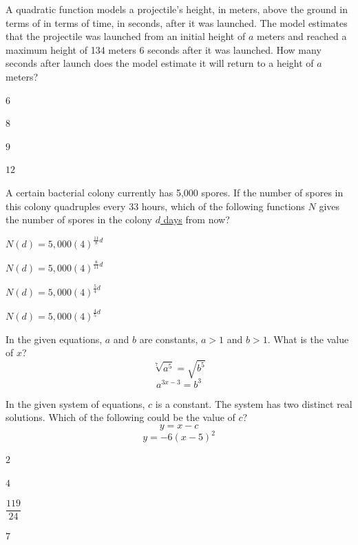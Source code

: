 \vfill
\noindent\begin{minipage}{\linewidth}
\par\smallskip
A quadratic function models a projectile's height, in meters, above the ground in terms of in terms of time, in seconds, after it was launched. The model estimates that the projectile was launched from an initial height of $a$ meters and reached a maximum height of 134 meters 6 seconds after it was launched. How many seconds after launch does the model estimate it will return to a height of $a$ meters?
\begin{satchoices}
  \item[A)] $6$
  \item[B)] $8$
  \item[C)] $9$
  \item[D)] $12$
\end{satchoices}
\end{minipage}
\vfill
\clearpage
\noindent\begin{minipage}{\linewidth}
\par\smallskip
A certain bacterial colony currently has 5,000 spores. If the number of spores in this colony quadruples every 33 hours, which of the following functions $N$ gives the number of spores in the colony \underline{$d$ days} from now?
\begin{satchoices}
  \item[A)] $N(d)=5{,}000(4)^{\frac{11}{8}d}$
  \item[B)] $N(d)=5{,}000(4)^{\frac{8}{11}d}$
  \item[C)] $N(d)=5{,}000(4)^{\frac{5}{4}d}$
  \item[D)] $N(d)=5{,}000(4)^{\frac{4}{5}d}$
\end{satchoices}
\end{minipage}
\vfill
\noindent\begin{minipage}{\linewidth}
\par\smallskip
In the given equations, $a$ and $b$ are constants, $a>1$ and $b>1$. What is the value of $x$? $$\sqrt[7]{a^5}=\sqrt{b^5}$$ $$a^{3x-3}=b^3$$
\end{minipage}
\vfill
\noindent\begin{minipage}{\linewidth}
\par\smallskip
In the given system of equations, $c$ is a constant. The system has two distinct real solutions. Which of the following could be the value of $c$? $$y=x-c$$ $$y=-6(x-5)^2$$
\begin{satchoices}
  \item[A)] $2$
  \item[B)] $4$
  \item[C)] $\dfrac{119}{24}$
  \item[D)] $7$
\end{satchoices}
\end{minipage}
